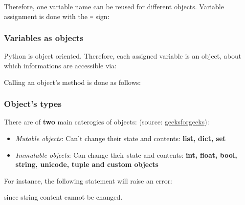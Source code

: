 \begin{frame}[fragile]
    Therefore, one variable name can be reused for different objects. Variable assignment is done with the \verb+=+ sign:
    

\end{frame}


\begin{frame}[fragile]
    \frametitle{Variables as objects}

    Python is object oriented. Therefore, each assigned variable is an object, about which informations are accessible via:
    

    \vspace{1em}
    Calling an object's method is done as follows:
    

\end{frame}
    
\begin{frame}[fragile]
    \frametitle{Object's types}

    There are of \textbf{two} main caterogies of objects: (source: \href{https://www.geeksforgeeks.org/mutable-vs-immutable-objects-in-python/}{geeksforgeeks}): \\
    \begin{itemize}
        \item{\emph{Mutable objects}: Can't change their state and contents: \textbf{list, dict, set}}
        \item{\emph{Immutable objects}: Can change their state and contents: \textbf{int, float, bool, string, unicode, tuple and custom objects}}
    \end{itemize}

    \vspace{1em}
    For instance, the following statement will raise an error:
    

    since string content cannot be changed.

\end{frame}
